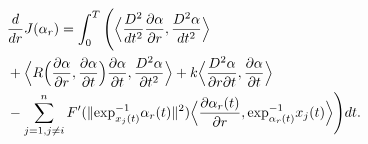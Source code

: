 \documentclass[letterpaper, 10 pt, conference]{ieeeconf}  %
\begin{document}
\begin{equation*}
\begin{split}
& \frac{d}{dr}J(\alpha_r) = \int_0^T \Bigg( \Big \langle \frac{D^2}{dt^2}\frac{\partial \alpha}{\partial r}, \frac{D^2 \alpha}{dt^2}\Big \rangle \\ & + \Big \langle R\Big(\frac{\partial \alpha}{\partial r}, \frac{\partial \alpha}{\partial t}\Big) \frac{\partial \alpha}{\partial t}, \frac{D^2 \alpha}{\partial t^2} \Big \rangle +  k\Big \langle\frac{D^2 \alpha}{\partial r \partial t}, \frac{\partial \alpha}{\partial t} \Big \rangle \\ &- \sum\limits_{j=1, j \neq i}^{n} F'(\| \hbox{exp}^{-1}_{x_{j}(t)}\alpha_r(t)\|^2)\Big \langle  \frac{\partial\alpha_r(t)}{\partial r}, \hbox{exp}^{-1}_{\alpha_r(t)}x_j(t) \Big \rangle \Bigg)dt.
\end{split}
\end{equation*}
\end{document}
